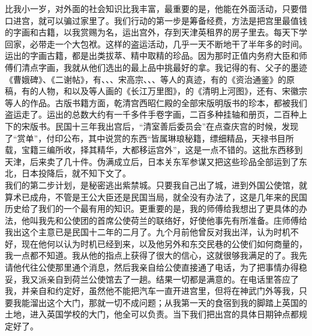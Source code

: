 比我小一岁，对外面的社会知识比我丰富，最重要的是，他能在外面活动，只要借口进宫，就可以骗过家里了。我们行动的第一步是筹备经费，方法是把宫里最值钱的字画和古籍，以我赏赐为名，运出宫外，存到天津英租界的房子里去。每天下学回家，必带走一个大包袱。这样的盗运活动，几乎一天不断地干了半年多的时间。运出的字画古籍，都是出类拔萃、精中取精的珍品。因为那时正值内务府大臣和师傅们清点字画，我就从他们选出的最上品中挑最好的拿。我记得的有、父子的墨迹《曹娥碑》、《二谢帖》，有、、、宋高宗、、、等人的真迹，有的《资治通鉴》的原稿，有的人物，和以及等人画的《长江万里图》，的《清明上河图》，还有、宋徽宗等人的作品。古版书籍方面，乾清宫西昭仁殿的全部宋版明版书的珍本，都被我们盗运走了。运出的总数大约有一千多件手卷字画，二百多种挂轴和册页，二百种上下的宋版书。民国十三年我出宫后，“清室善后委员会”在点查庆宫的时候，发现了“赏单”，付印公布，其中说赏的东西“皆属琳琅秘籍，缥细精品，天禄书目所载，宝籍三编所收，择其精华，大都移运宫外”，这是一点不错的。这批东西移到天津，后来卖了几十件。伪满成立后，日本关东军参谋又把这些珍品全部运到了东北，日本投降后，就不知下文了。\\

我们的第二步计划，是秘密逃出紫禁城。只要我自己出了城，进到外国公使馆，就算术已成舟，不管是王公大臣还是民国当局，就全没有办法了，这是几年来的民国历史给了我们的一个最有用的知识。更重要的是，我的师傅给我想出了更具体的办法，他叫我先和公使团的首席公使荷兰的联络好，好使他事先有所准备。庄师傅给我出这个主意已是民国十二年的二月了。九个月前他曾反对我出洋，认为时机不好，现在他何以认为时机已经到来，以及他另外和东交民巷的公使们如何商量的，我一点都不知道。我从他的指点上获得了很大的信心，这就很够我满足的了。我先请他代往公使那里通个消息，然后我亲自给公使直接通了电话，为了把事情办得稳妥，我又派亲自到荷兰公使馆去了一趟。结果一切都是满意的。在电话里答应了我，并亲自和约定好，虽然他不能把汽车一直开进宫里，但将在神武门外等我，只要我能溜出这个大门，那就一切不成问题；从我第一天的食宿到我的脚踏上英国的土地，进入英国学校的大门，他全可以负责。当下我们把出宫的具体日期钟点都规定好了。\\

